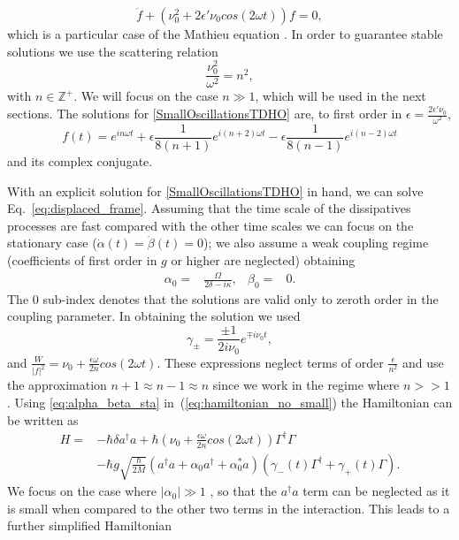 \documentclass[reprint, amsmath,amssymb, aps,pra]{revtex4-1}
\begin{document}
\begin{equation}\label{SmallOscillationsTDHO}
\ddot{f} + (\nu_0^2 + 2\epsilon' \nu_0 cos(2\omega t))f = 0,
\end{equation}
which is a particular case of the Mathieu equation \cite{PiatekME}.
In order to guarantee stable solutions we use the scattering
relation
\begin{equation}
\frac{\nu_0^2}{\omega^2} = n^2,\label{scattering}
\end{equation}
with $n \in \mathbb{Z}^+$\cite{WardFT}. We will focus on the case
$n\gg 1$, which will be used in the next sections. The solutions for
\eqref{SmallOscillationsTDHO} are, to first order in
$\epsilon= \frac{2\epsilon' \nu_0}{\omega^2}$,
\begin{equation}\label{SmallOscillationsSolution}
f(t)=  e^{in\omega t}  + \epsilon \frac{1}{8(n+1)} e^{i(n+2)\omega t} - \epsilon \frac{1}{8(n-1)} e^{i(n-2)\omega t}
\end{equation} and its complex conjugate.


With an explicit solution for \eqref{SmallOscillationsTDHO} in hand,
we can solve Eq.~\eqref{eq:displaced_frame}. Assuming that the time
scale of the dissipatives processes are fast compared with the other
time scales we can focus on the stationary case
($\dot{\alpha}(t)=\dot{\beta}(t)=0$); we also assume a weak coupling
regime (coefficients of first order in $g$ or higher are neglected)
obtaining
\begin{align}\label{eq:alpha_beta_sta}
\alpha_0 =& \frac{\Omega}{2\delta-i\kappa},& \beta_0 =& 0.
\end{align}
The 0 sub-index denotes that the solutions are valid only to zeroth
order in the coupling parameter. In obtaining the solution we used
\begin{equation}
\gamma_\pm= \frac{\pm 1}{2i\nu_0}e^{\mp i\nu_0 t},
\end{equation}
and  $\frac{W}{|f|^2} = \nu_0 + \frac{\epsilon \omega}{2n} cos(2\omega t)$. These expressions neglect terms of order $\frac{\epsilon}{n^2}$ and use the approximation $n+1 \approx n-1 \approx n$ since we work in the regime where $n >> 1$. Using \eqref{eq:alpha_beta_sta} in~(\ref{eq:hamiltonian_no_small})
the Hamiltonian can be written as
\begin{align}
H =& -\hbar \delta a^{\dagger}a +\hbar(\nu_0 + \frac{\epsilon \omega}{2n} cos(2\omega t))\Gamma^{\dagger}\Gamma \\
&-\hbar g\sqrt{\frac{\hbar}{2M}}(a^{\dagger}a +\alpha_0 a^{\dagger}+\alpha^*_0 a)(\gamma_-(t)\Gamma^{\dagger}+\gamma_+(t)\Gamma)\nonumber.
\end{align}
We focus on the case where $|\alpha_0| \gg 1$
\cite{BarberisLC}, so that the $a^\dagger a$ term can be neglected as
it is small when compared to the other two terms in the interaction.
This leads to a further simplified Hamiltonian
\end{document}
